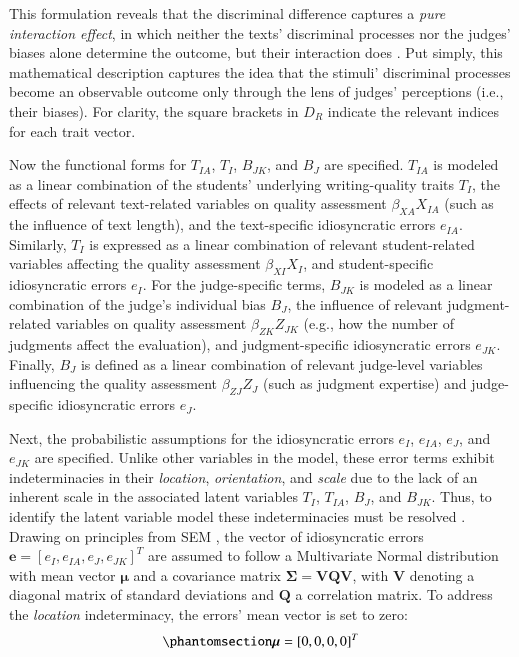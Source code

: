 \documentclass[
  authoryear,
  review,
  1p]{elsarticle}
\begin{document}
This formulation reveals that the discriminal difference captures a
\emph{pure interaction effect}, in which neither the texts' discriminal
processes nor the judges' biases alone determine the outcome, but their
interaction does \citep{Attia_et_al_2022}. Put simply, this mathematical
description captures the idea that the stimuli' discriminal processes
become an observable outcome only through the lens of judges'
perceptions (i.e., their biases). For clarity, the square brackets in
\(D_{R}\) indicate the relevant indices for each trait vector.

Now the functional forms for \(T_{IA}\), \(T_{I}\), \(B_{JK}\), and
\(B_{J}\) are specified. \(T_{IA}\) is modeled as a linear combination
of the students' underlying writing-quality traits \(T_{I}\), the
effects of relevant text-related variables on quality assessment
\(\beta_{XA}X_{IA}\) (such as the influence of text length), and the
text-specific idiosyncratic errors \(e_{IA}\). Similarly, \(T_{I}\) is
expressed as a linear combination of relevant student-related variables
affecting the quality assessment \(\beta_{XI} X_{I}\), and
student-specific idiosyncratic errors \(e_{I}\). For the judge-specific
terms, \(B_{JK}\) is modeled as a linear combination of the judge's
individual bias \(B_{J}\), the influence of relevant judgment-related
variables on quality assessment \(\beta_{ZK}Z_{JK}\) (e.g., how the
number of judgments affect the evaluation), and judgment-specific
idiosyncratic errors \(e_{JK}\). Finally, \(B_{J}\) is defined as a
linear combination of relevant judge-level variables influencing the
quality assessment \(\beta_{ZJ}Z_{J}\) (such as judgment expertise) and
judge-specific idiosyncratic errors \(e_{J}\).

Next, the probabilistic assumptions for the idiosyncratic errors
\(e_{I}\), \(e_{IA}\), \(e_{J}\), and \(e_{JK}\) are specified. Unlike
other variables in the model, these error terms exhibit indeterminacies
in their \emph{location}, \emph{orientation}, and \emph{scale} due to
the lack of an inherent scale in the associated latent variables
\(T_{I}\), \(T_{IA}\), \(B_{J}\), and \(B_{JK}\). Thus, to identify the
latent variable model these indeterminacies must be resolved
\citep{Depaoli_2021, deAyala_2009}. Drawing on principles from SEM
\citep{Hoyle_et_al_2023}, the vector of idiosyncratic errors
\(\boldsymbol{e} = [e_{I}, e_{IA}, e_{J}, e_{JK}]^{T}\) are assumed to
follow a Multivariate Normal distribution with mean vector
\(\boldsymbol{\mu}\) and a covariance matrix
\(\boldsymbol{\Sigma} = \boldsymbol{V} \boldsymbol{Q} \boldsymbol{V}\),
with \(\boldsymbol{V}\) denoting a diagonal matrix of standard
deviations and \(\boldsymbol{Q}\) a correlation matrix. To address the
\emph{location} indeterminacy, the errors' mean vector is set to zero:
\begin{equation}\phantomsection\label{eq-mat53}{
\boldsymbol{\mu} = [0, 0, 0, 0]^{T}
}\end{equation}
\end{document}
